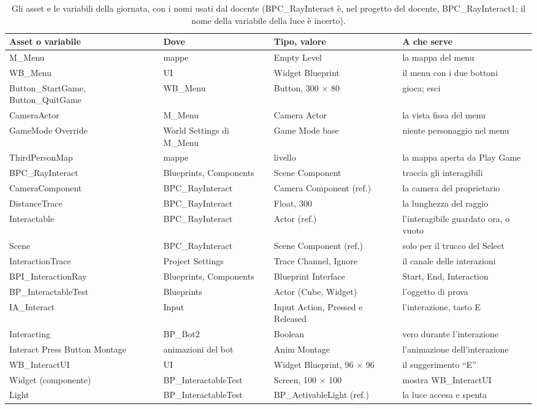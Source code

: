 \begin{table}[htbp]
\centering
\small
\begin{tabular}{@{}p{3.7cm}p{3.0cm}p{2.9cm}p{4.4cm}@{}}
\toprule
\textbf{Asset o variabile} & \textbf{Dove} & \textbf{Tipo, valore} & \textbf{A che serve} \\
\midrule
M\_Menu & mappe & Empty Level & la mappa del menu \\
WB\_Menu & UI & Widget Blueprint & il menu con i due bottoni \\
Button\_StartGame, Button\_QuitGame & WB\_Menu & Button, 300 $\times$ 80 & gioca; esci \\
CameraActor & M\_Menu & Camera Actor & la vista fissa del menu \\
GameMode Override & World Settings di M\_Menu & Game Mode base & niente personaggio nel menu \\
ThirdPersonMap & mappe & livello & la mappa aperta da Play Game \\
BPC\_RayInteract & Blueprints, Components & Scene Component & traccia gli interagibili \\
CameraComponent & BPC\_RayInteract & Camera Component (ref.) & la camera del proprietario \\
DistanceTrace & BPC\_RayInteract & Float, 300 & la lunghezza del raggio \\
Interactable & BPC\_RayInteract & Actor (ref.) & l'interagibile guardato ora, o vuoto \\
Scene & BPC\_RayInteract & Scene Component (ref.) & solo per il trucco del Select \\
InteractionTrace & Project Settings & Trace Channel, Ignore & il canale delle interazioni \\
BPI\_InteractionRay & Blueprints, Components & Blueprint Interface & Start, End, Interaction \\
BP\_InteractableTest & Blueprints & Actor (Cube, Widget) & l'oggetto di prova \\
IA\_Interact & Input & Input Action, Pressed e Released & l'interazione, tasto E \\
Interacting & BP\_Bot2 & Boolean & vero durante l'interazione \\
Interact Press Button Montage & animazioni del bot & Anim Montage & l'animazione dell'interazione \\
WB\_InteractUI & UI & Widget Blueprint, 96 $\times$ 96 & il suggerimento ``E'' \\
Widget (componente) & BP\_InteractableTest & Screen, 100 $\times$ 100 & mostra WB\_InteractUI \\
Light & BP\_InteractableTest & BP\_ActivableLight (ref.) & la luce accesa e spenta \\
\bottomrule
\end{tabular}
\caption{Gli asset e le variabili della giornata, con i nomi usati dal docente (BPC\_RayInteract
è, nel progetto del docente, BPC\_RayInteract1; il nome della variabile della luce è
incerto).}
\label{ue12:tab:asset}
\end{table}

